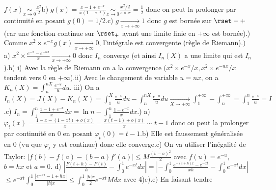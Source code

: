 $\displaystyle{f(x)\underset{x\rightarrow 0}{\sim}
\frac{x^2}{2}}$\newline b)
$\displaystyle{g(x)=\frac{x-1+e^{-x}}{x(1-e^{-x})}\underset{x\rightarrow
0}{\sim} \frac{x^2/2}{x\times x}=\frac{1}{2}}$ donc on peut la
prolonger par continuit\'e en posant $g(0)=1/2$.\newline c)
$g\underset{x\rightarrow +\infty}{\longrightarrow} 1$ donc $g$ est
born\'ee sur $\rset-+$ (car une fonction continue sur $\rset_+$
ayant une limite finie en $+\infty$ est born\'ee).)
Comme $x^2\times e^{-x}g(x)\underset{x\rightarrow
+\infty}{\longrightarrow} 0$, l'int\'egrale est convergente
(r\`egle de Riemann).) a) $\displaystyle{x^2\times
\frac{e^{-x}-e^{-nx}}{x}\underset{x\rightarrow
+\infty}{\longrightarrow} 0}$ donc $I_n$ converge (et ainsi
$I_n(X)$ a une limite qui est $I_n$).\newline b) i) Avec la
r\`egle de Riemann on a la convergence ($x^2\times e^{-x}/x,
x^2\times e^{-nx}/x$ tendent vers 0 en $+\infty$).\newline ii)
Avec le changement de variable $u=nx$, on a
$\displaystyle{K_n(X)=\int_n^{nX}\frac{e^{-u}}{u}du}$.\newline
iii) On a $\displaystyle{I_n(X)=J(X)-K_n(X)=\int_1^X
\frac{e^{-u}}{u}du-\int_n^{nX}\frac{e^{-u}}{u}du\underset{X\rightarrow
+\infty}{\longrightarrow}
\int_1^{+\infty}-\int_n^{+\infty}=\int_1^n
\frac{e^{-u}}{u}=I}$.\newline c) $\displaystyle{I_n=\int_1^n
\frac{1-1+e^{-x}}{x}dx=\ln n-\int_1^n
\frac{1-e^{-x}}{x}dx}$.) a)
$\displaystyle{\varphi_t(x)=\frac{1-x-(1-xt)+o(x)}{x}=\frac{x(t-1)+o(x)}{x}\sim
t-1}$ donc on peut la prolonger par continuit\'e en 0 en posant
$\varphi_t(0)=t-1$.\newline b) Elle est faussement
g\'en\'eralis\'ee en 0 (vu que $\varphi_t$ y est continue) donc
elle converge.\newline c) On va utiliser l'in\'egalit\'e de
Taylor: $\displaystyle{|f(b)-f(a)-(b-a)f'(a)|\leq
M\frac{(b-a)^2}{2}}$ avec $f(u)=e^{-u}$, $b=hx$ et $a=0$.\newline
d) $\displaystyle{|\frac{F(t+h)-F(t)}{h}-\int_0^1
e^{-xt}dx|=|-\int_0^1 \frac{e^{-(t+h)x}-e^{-xt}}{xh}-\int_0^1
e^{-xt}dx|}$\newline $\displaystyle{\leq e^{-xt}\int_0^1
\frac{|e^{-hx}-1+hx|}{|h|x}\leq \int_0^1
\frac{|h|x}{2}e^{-xt}Mdx}$ avec 4)c).\newline e) En faisant tendre
